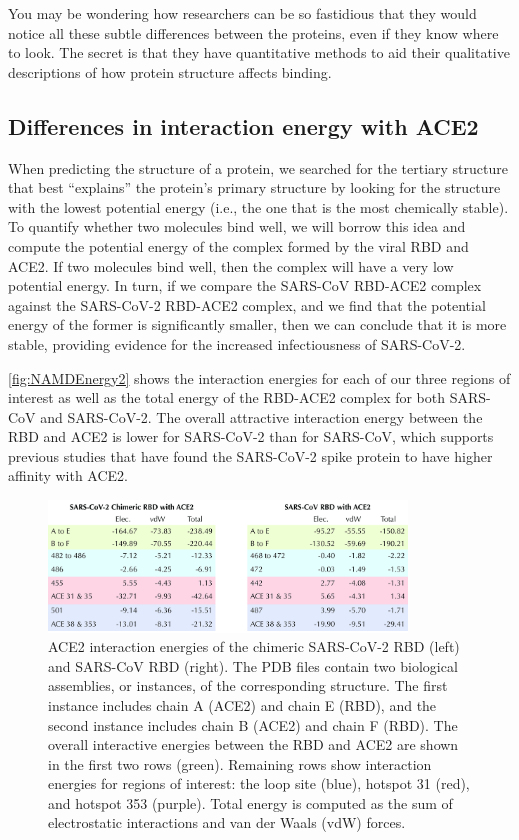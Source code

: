 You may be wondering how researchers can be so fastidious that they would notice all these subtle differences between the proteins, even if they know where to look. The secret is that they have quantitative methods to aid their qualitative descriptions of how protein structure affects binding.

\FloatBarrier
{}
\subsection{Differences in interaction energy with ACE2}

When predicting the structure of a protein, we searched for the tertiary structure that best ``explains'' the protein's primary structure by looking for the structure with the lowest potential energy (i.e., the one that is the most chemically stable). To quantify whether two molecules bind well, we will borrow this idea and compute the potential energy of the complex formed by the viral RBD and ACE2. If two molecules bind well, then the complex will have a very low potential energy. In turn, if we compare the SARS-CoV RBD-ACE2 complex against the SARS-CoV-2 RBD-ACE2 complex, and we find that the potential energy of the former is significantly smaller, then we can conclude that it is more stable, providing evidence for the increased infectiousness of SARS-CoV-2.

\autoref{fig:NAMDEnergy2} shows the interaction energies for each of our three regions of interest as well as the total energy of the RBD-ACE2 complex for both SARS-CoV and SARS-CoV-2. The overall attractive interaction energy between the RBD and ACE2 is lower for SARS-CoV-2 than for SARS-CoV, which supports previous studies that have found the SARS-CoV-2 spike protein to have higher affinity with ACE2.

\begin{figure}[h]
	\centering
	\mySfFamily
	\includegraphics[width = 0.85\textwidth]{../images_CMYK/NAMDEnergy2_edited}
	\caption{ACE2 interaction energies of the chimeric SARS-CoV-2 RBD (left) and SARS-CoV RBD (right). The PDB files contain two biological assemblies, or instances, of the corresponding structure. The first instance includes chain A (ACE2) and chain E (RBD), and the second instance includes chain B (ACE2) and chain F (RBD). The overall interactive energies between the RBD and ACE2 are shown in the first two rows (green). Remaining rows show interaction energies for regions of interest: the loop site (blue), hotspot 31 (red), and hotspot 353 (purple). Total energy is computed as the sum of electrostatic interactions and van der Waals (vdW) forces.}
	\label{fig:NAMDEnergy2}
\end{figure}

